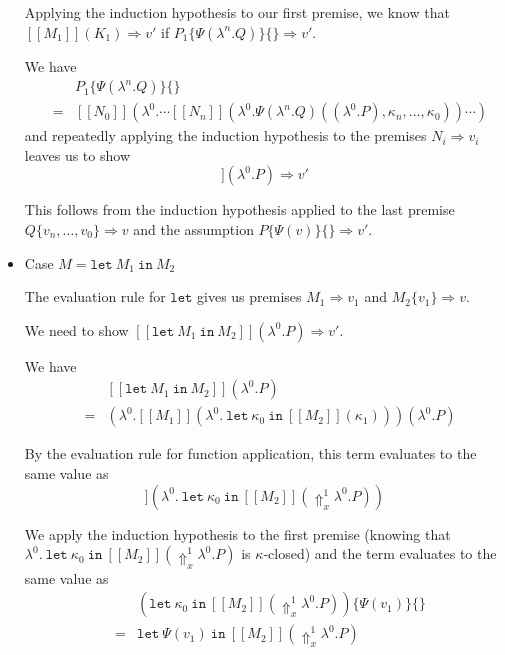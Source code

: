 \documentclass[a4paper,11pt]{article}
\begin{document}
\begin{itemize}
Applying the induction hypothesis to our first premise, we know that $[\![M_{1}]\!](K_{1}) \Rightarrow v'$ if $P_{1}\{\Psi(\lambda^{n}.Q)\}\{\} \Rightarrow v'$.

We have
\begin{eqnarray*}
&   & P_{1}\{\Psi(\lambda^{n}.Q)\}\{\} \\
& = & [\![N_{0}]\!](\lambda^{0}. \cdots [\![N_{n}]\!](\lambda^{0}.\Psi(\lambda^{n}.Q)((\lambda^{0}.P), \kappa_{n}, \ldots, \kappa_{0})) \cdots )
\end{eqnarray*}
and repeatedly applying the induction hypothesis to the premises $N_{i} \Rightarrow v_{i}$ leaves us to show
\begin{displaymath}
[\![Q\{v_{n}, \ldots, v_{0}\}]\!] (\lambda^{0}.P) \Rightarrow v'
\end{displaymath}

This follows from the induction hypothesis applied to the last premise
$Q\{v_{n}, \ldots, v_{0}\} \Rightarrow v$ and the assumption $P\{\Psi(v)\}\{\}
\Rightarrow v'$.

\item{Case $M = \texttt{let} \: M_{1} \: \texttt{in} \: M_{2}$}

The evaluation rule for $\texttt{let}$ gives us premises $M_{1} \Rightarrow v_{1}$ and $M_{2}\{v_{1}\} \Rightarrow v$.

We need to show
$[\![\texttt{let} \: M_{1} \: \texttt{in} \: M_{2}]\!](\lambda^{0}.P) \Rightarrow v'$.

We have
\begin{eqnarray*}
 &   & [\![\texttt{let} \: M_{1} \: \texttt{in} \: M_{2}]\!](\lambda^{0}.P) \\
 & = & (\lambda^{0}.[\![M_{1}]\!](\lambda^{0}. \: \texttt{let} \: \kappa_{0} \: \texttt{in} \: [\![M_{2}]\!](\kappa_{1})))(\lambda^{0}.P)
\end{eqnarray*}

By the evaluation rule for function application, this term evaluates to the same value as
\begin{displaymath}
[\![M_{1}]\!](\lambda^{0}. \: \texttt{let} \: \kappa_{0} \: \texttt{in} \: [\![M_{2}]\!](\Uparrow_{x}^{1} \lambda^{0}.P))
\end{displaymath}

We apply the induction hypothesis to the first premise (knowing that $\lambda^{0}. \: \texttt{let} \: \kappa_{0} \: \texttt{in} \: [\![M_{2}]\!](\Uparrow_{x}^{1} \lambda^{0}.P)$
is $\kappa$-closed) and the term evaluates to the same value as
\begin{eqnarray*}
 &   & (\texttt{let} \: \kappa_{0} \: \texttt{in} \: [\![M_{2}]\!](\Uparrow_{x}^{1} \lambda^{0}.P))\{\Psi(v_{1})\}\{\} \\
 & = & \texttt{let} \: \Psi(v_{1}) \: \texttt{in} \: [\![M_{2}]\!](\Uparrow_{x}^{1} \lambda^{0}.P)
\end{eqnarray*}


\end{itemize}
\end{document}
